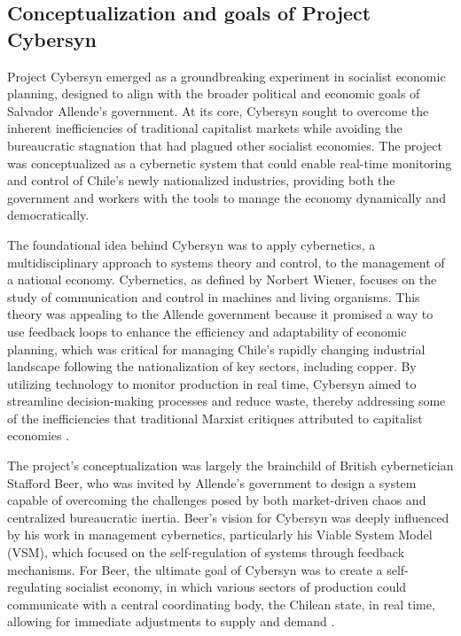 \begin{refsection}
\subsection{Conceptualization and goals of Project Cybersyn}

Project Cybersyn emerged as a groundbreaking experiment in socialist economic planning, designed to align with the broader political and economic goals of Salvador Allende's government. At its core, Cybersyn sought to overcome the inherent inefficiencies of traditional capitalist markets while avoiding the bureaucratic stagnation that had plagued other socialist economies. The project was conceptualized as a cybernetic system that could enable real-time monitoring and control of Chile's newly nationalized industries, providing both the government and workers with the tools to manage the economy dynamically and democratically.

The foundational idea behind Cybersyn was to apply cybernetics, a multidisciplinary approach to systems theory and control, to the management of a national economy. Cybernetics, as defined by Norbert Wiener, focuses on the study of communication and control in machines and living organisms. This theory was appealing to the Allende government because it promised a way to use feedback loops to enhance the efficiency and adaptability of economic planning, which was critical for managing Chile's rapidly changing industrial landscape following the nationalization of key sectors, including copper. By utilizing technology to monitor production in real time, Cybersyn aimed to streamline decision-making processes and reduce waste, thereby addressing some of the inefficiencies that traditional Marxist critiques attributed to capitalist economies \cite[pp.~4-7]{beer1975}.

The project's conceptualization was largely the brainchild of British cybernetician Stafford Beer, who was invited by Allende's government to design a system capable of overcoming the challenges posed by both market-driven chaos and centralized bureaucratic inertia. Beer's vision for Cybersyn was deeply influenced by his work in management cybernetics, particularly his Viable System Model (VSM), which focused on the self-regulation of systems through feedback mechanisms. For Beer, the ultimate goal of Cybersyn was to create a self-regulating socialist economy, in which various sectors of production could communicate with a central coordinating body, the Chilean state, in real time, allowing for immediate adjustments to supply and demand \cite[pp.~93-98]{medina2011}.


\end{refsection}
